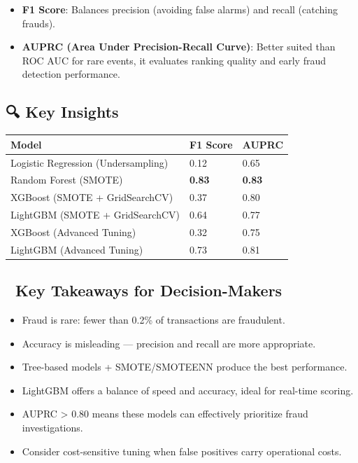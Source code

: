 \documentclass[
  letterpaper,
  DIV=11,
  numbers=noendperiod]{scrartcl}
\providecommand{\tightlist}{%
  \setlength{\itemsep}{0pt}\setlength{\parskip}{0pt}}
\begin{document}
\begin{itemize}
\tightlist
\item
  \textbf{F1 Score}: Balances precision (avoiding false alarms) and
  recall (catching frauds).
\item
  \textbf{AUPRC (Area Under Precision-Recall Curve)}: Better suited than
  ROC AUC for rare events, it evaluates ranking quality and early fraud
  detection performance.
\end{itemize}

\subsection{🔍 Key Insights}\label{key-insights}

\begin{longtable}[]{@{}lll@{}}
\toprule\noalign{}
Model & F1 Score & AUPRC \\
\midrule\noalign{}
\endhead
\bottomrule\noalign{}
\endlastfoot
Logistic Regression (Undersampling) & 0.12 & 0.65 \\
Random Forest (SMOTE) & \textbf{0.83} & \textbf{0.83} \\
XGBoost (SMOTE + GridSearchCV) & 0.37 & 0.80 \\
LightGBM (SMOTE + GridSearchCV) & 0.64 & 0.77 \\
XGBoost (Advanced Tuning) & 0.32 & 0.75 \\
LightGBM (Advanced Tuning) & 0.73 & 0.81 \\
\end{longtable}

\subsection{📌 Key Takeaways for
Decision-Makers}\label{key-takeaways-for-decision-makers}

\begin{itemize}
\tightlist
\item
  Fraud is rare: fewer than 0.2\% of transactions are fraudulent.
\item
  Accuracy is misleading --- precision and recall are more appropriate.
\item
  Tree-based models + SMOTE/SMOTEENN produce the best performance.
\item
  LightGBM offers a balance of speed and accuracy, ideal for real-time
  scoring.
\item
  AUPRC \textgreater{} 0.80 means these models can effectively
  prioritize fraud investigations.
\item
  Consider cost-sensitive tuning when false positives carry operational
  costs.
\end{itemize}
\end{document}
